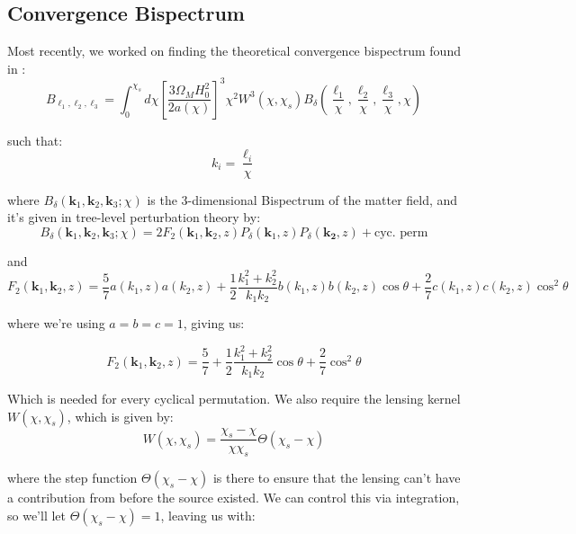 \documentclass[11pt]{article}
\renewcommand{\_}[1]{\underline{ #1 }}
\begin{document}
{\subsection{Convergence Bispectrum}\label{convergencebispec}

Most recently, we worked on finding the theoretical convergence bispectrum found in \cite{Munshi_2020}:
\begin{equation}
    B_{\ell_1, \ell_2, \ell_3} = \int_0^{\chi_s} d\chi \left[\frac{3\Omega_M H_0^2}{2a(\chi)}\right]^3 \chi^2 W^3(\chi, \chi_s) B_{\delta}\left(\frac{\ell_1}{\chi}, \frac{\ell_2}{\chi}, \frac{\ell_3}{\chi}, \chi\right)
\end{equation}

such that:
\begin{equation}
    k_i = \frac{\ell_i}{\chi}
\end{equation}

where $B_{\delta}(\mathbf{k}_1, \mathbf{k}_2, \mathbf{k}_3; \chi)$ is the 3-dimensional Bispectrum of the matter field, and it's given in tree-level perturbation theory by:
\begin{equation}
    B_{\delta}(\mathbf{k}_1, \mathbf{k}_2, \mathbf{k}_3; \chi) = 2F_2(\mathbf{k}_1, \mathbf{k}_2, z)P_{\delta}(\mathbf{k}_1,z)P_{\delta}(\mathbf{k_2},z) + \text{cyc. perm}
\end{equation}

and
\begin{equation}
    F_2(\mathbf{k}_1, \mathbf{k}_2, z) = \frac57 a(k_1, z)a(k_2, z) + \frac12 \frac{k_1^2 + k_2^2}{k_1k_2}b(k_1, z)b (k_2,z)\cos\theta + \frac27 c(k_1, z)c(k_2,z)\cos^2\theta
\end{equation}

where we're using $a = b = c = 1$, giving us:

\begin{equation}
    F_2(\mathbf{k}_1, \mathbf{k}_2, z) = \frac57 + \frac12 \frac{k_1^2 + k_2^2}{k_1k_2}\cos\theta + \frac27\cos^2\theta
\end{equation}

Which is needed for every cyclical permutation. We also require the lensing kernel $W(\chi, \chi_s)$, which is given by:
\begin{equation}
    W(\chi, \chi_s) = \frac{\chi_s - \chi}{\chi\chi_s}\Theta(\chi_s - \chi)
\end{equation}

where the step function $\Theta(\chi_s - \chi)$ is there to ensure that the lensing can’t have a contribution from before the source existed. We can control this via integration, so we'll let $\Theta(\chi_s - \chi) = 1$, leaving us with:

}
\end{document}
